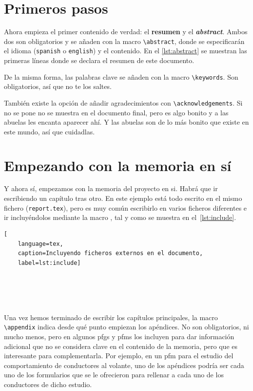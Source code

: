 \documentclass[%
    school=etsisi,%
    degree=61TI,%
]{upm-report}
\begin{document}
\section{Primeros pasos}

Ahora empieza el primer contenido de verdad: el \textbf{resumen} y el
\textbf{\textit{abstract}}. Ambos dos son obligatorios y se añaden con
la macro \lstinline{\abstract}, donde se especificarán el idioma
(\texttt{spanish} o \texttt{english}) y el contenido. En el
\autoref{lst:abstract} se muestran las primeras líneas donde se declara
el resumen de este documento.



De la misma forma, las palabras clave se añaden con la macro
\lstinline{\keywords}. Son obligatorios, así que no te los saltes.



También existe la opción de añadir agradecimientos con
\lstinline{\acknowledgements}. Si no se pone no se muestra en el
documento final, pero es algo bonito y a las abuelas les encanta
aparecer ahí. Y las abuelas son de lo más bonito que existe en este
mundo, así que cuidadlas.

\section{Empezando con la memoria en sí}

Y ahora sí, empezamos con la memoria del proyecto en si. Habrá que ir
escribiendo un capítulo tras otro. En este ejemplo está todo escrito en
el mismo fichero (\texttt{report.tex}), pero es muy común escribirlo en
varios ficheros diferentes e ir incluyéndolos mediante la macro
\lstinline{}, tal y como se muestra en el~\autoref{lst:include}.

\begin{lstlisting}[
    language=tex,
    caption=Incluyendo ficheros externos en el documento,
    label=lst:include]





\end{lstlisting}

Una vez hemos terminado de escribir los capítulos principales, la macro
\lstinline{\appendix} indica desde qué punto empiezan los apéndices. No
son obligatorios, ni mucho menos, pero en algunos \glspl{pfg} y
\glspl{pfm} los incluyen para dar información adicional que no se
considera clave en el contenido de la memoria, pero que es interesante
para complementarla. Por ejemplo, en un \gls{pfm} para el estudio del
comportamiento de conductores al volante, uno de los apéndices podría
ser cada uno de los formularios que se le ofrecieron para rellenar a
cada uno de los conductores de dicho estudio.
\end{document}
